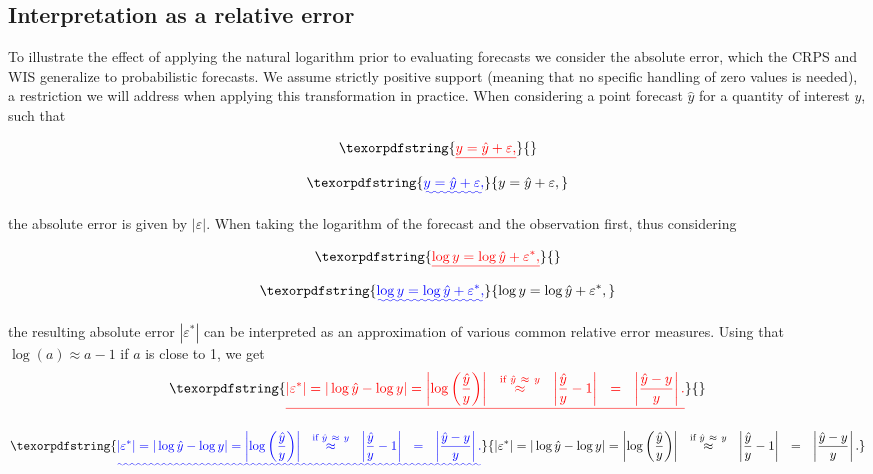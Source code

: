 \documentclass{article}
\providecommand{\DIFaddtex}[1]{{\protect\color{blue}\uwave{#1}}} %
\providecommand{\DIFdeltex}[1]{{\protect\color{red}\sout{#1}}}                      %
\providecommand{\DIFaddbegin}{} %
\providecommand{\DIFaddend}{} %
\providecommand{\DIFdelbegin}{} %
\providecommand{\DIFdelend}{} %
\providecommand{\DIFadd}[1]{\texorpdfstring{\DIFaddtex{#1}}{#1}} %
\providecommand{\DIFdel}[1]{\texorpdfstring{\DIFdeltex{#1}}{}} %
\newcommand{\DIFscaledelfig}{0.5}
\newlength{\DIFdelgraphicswidth} %
\newlength{\DIFdelgraphicsheight} %
\newcommand{\DIFaddincludegraphics}[2][]{{\color{blue}\fbox{\DIFOincludegraphics[#1]{#2}}}} %
\newcommand{\DIFdelincludegraphics}[2][]{%
\sbox{\DIFdelgraphicsbox}{\DIFOincludegraphics[#1]{#2}}%
\settoboxwidth{\DIFdelgraphicswidth}{\DIFdelgraphicsbox} %
\settoboxtotalheight{\DIFdelgraphicsheight}{\DIFdelgraphicsbox} %
\scalebox{\DIFscaledelfig}{%
\parbox[b]{\DIFdelgraphicswidth}{\usebox{\DIFdelgraphicsbox}\\[-\baselineskip] \rule{\DIFdelgraphicswidth}{0em}}\llap{\resizebox{\DIFdelgraphicswidth}{\DIFdelgraphicsheight}{%
\setlength{\unitlength}{\DIFdelgraphicswidth}%
\begin{picture}(1,1)%
\thicklines\linethickness{2pt} %
{\color[rgb]{1,0,0}\put(0,0){\framebox(1,1){}}}%
{\color[rgb]{1,0,0}\put(0,0){\line( 1,1){1}}}%
{\color[rgb]{1,0,0}\put(0,1){\line(1,-1){1}}}%
\end{picture}%
}\hspace*{3pt}}} %
} %
\DeclareRobustCommand{\DIFaddbegin}{\DIFOaddbegin \let\includegraphics\DIFaddincludegraphics} %
\DeclareRobustCommand{\DIFaddend}{\DIFOaddend \let\includegraphics\DIFOincludegraphics} %
\DeclareRobustCommand{\DIFdelbegin}{\DIFOdelbegin \let\includegraphics\DIFdelincludegraphics} %
\DeclareRobustCommand{\DIFdelend}{\DIFOaddend \let\includegraphics\DIFOincludegraphics} %
\begin{document}
\subsection{Interpretation as a relative error}
\label{sec:methods:relative}

To illustrate the effect of applying the natural logarithm prior to evaluating forecasts we consider the absolute error, which the CRPS and WIS generalize to probabilistic forecasts. We assume strictly positive support (meaning that no specific handling of zero values is needed), a restriction we will address when applying this transformation in practice. When considering a point forecast $\hat{y}$ for a quantity of interest $y$, such that 
%
\begin{linenomath*}
\DIFdelbegin \begin{displaymath}
\DIFdel{y = \hat{y} + \varepsilon,
}\end{displaymath}%
\DIFdelend \DIFaddbegin \begin{equation}
\DIFadd{y = \hat{y} + \varepsilon,
}\end{equation}\DIFaddend 
\end{linenomath*}
the absolute error is given by $|\varepsilon|$. When taking the logarithm of the forecast and the observation first, thus considering 
\begin{linenomath*}
\DIFdelbegin \begin{displaymath}
\DIFdel{\log y = \log \hat{y} + \varepsilon^*,
}\end{displaymath}%
\DIFdelend \DIFaddbegin \begin{equation}
\DIFadd{\log y = \log \hat{y} + \varepsilon^*,
}\end{equation}\DIFaddend 
\end{linenomath*}
the resulting absolute error $\left|\varepsilon^*\right|$ can be interpreted as an approximation of various common relative error measures. Using that $\log(a) \approx a - 1$ if $a$ is close to 1, we get
\DIFdelbegin \begin{displaymath}
\DIFdel{|\varepsilon^*| = |\log \hat{y} - \log y| = \left|\log\left(\frac{\hat{y}}{y}\right) \right| \ \ \stackrel{\text{if } \hat{y} \ \approx \ y}{\approx} \ \ \left| \frac{\hat{y}}{y} - 1 \right| \ \ = \ \ \left| \frac{\hat{y} - y}{y} \right|.
}\end{displaymath}%
\DIFdelend \DIFaddbegin \begin{linenomath*}
\begin{equation}
\DIFadd{|\varepsilon^*| = |\log \hat{y} - \log y| = \left|\log\left(\frac{\hat{y}}{y}\right) \right| \ \ \stackrel{\text{if } \hat{y} \ \approx \ y}{\approx} \ \ \left| \frac{\hat{y}}{y} - 1 \right| \ \ = \ \ \left| \frac{\hat{y} - y}{y} \right|.
}\end{equation}\DIFaddend 
\DIFaddbegin \end{linenomath*}
\end{document}
